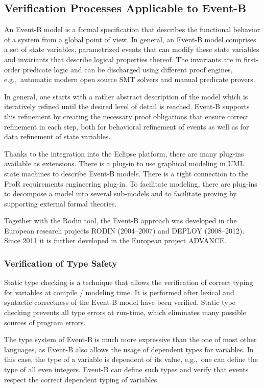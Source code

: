 \subsection{Verification Processes Applicable to Event-B}
\label{sec:verif-proc-appl}

An Event-B model is a formal specification that describes the functional
behavior of a system from a global point of view. In general, an Event-B model
comprises a set of state variables, parametrized events that can modify these
state variables and invariants that describe logical properties thereof.  The
invariants are in first-order predicate logic and can be discharged using
different proof engines, e.g.,\  automatic modern open source SMT solvers and
manual predicate provers.

In general, one starts with a rather abstract description of the model which is
iteratively refined until the desired level of detail is reached. Event-B
supports this refinement by creating the necessary proof obligations that ensure
correct refinement in each step, both for behavioral refinement of events as
well as for data refinement of state variables.

Thanks to the integration into the Eclipse platform, there are many plug-ins
available as extensions. There is a plug-in to use graphical modeling in UML
state machines to describe Event-B models. There is a tight connection to the
ProR requirements engineering plug-in. To facilitate modeling, there are
plug-ins to decompose a model into several sub-models and to facilitate proving
by supporting external formal theories.

Together with the Rodin tool, the Event-B approach was developed in the European
research projects RODIN (2004--2007) and DEPLOY (2008--2012). Since 2011 it is
further developed in the European project ADVANCE\@.

\subsubsection{Verification of Type Safety}
\label{sec:verif-type-safety}

Static type checking is a technique that allows the verification of correct
typing for variables at compile / modeling time. It is performed after lexical
and syntactic correctness of the Event-B model have been verified. Static type
checking prevents all type errors at run-time, which eliminates many possible
sources of program errors.

The type system of Event-B is much more expressive than the one of most other
languages, as Event-B also allows the usage of dependent types for variables. In
this case, the type of a variable is dependent of its value, e.g.,\ one can
define the type of all even integers. Event-B can define such types and verify
that events respect the correct dependent typing of variables

